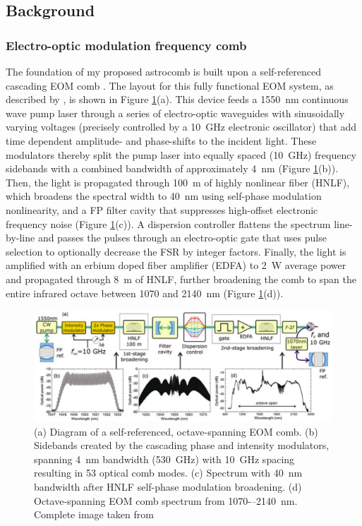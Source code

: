 \documentclass[11pt]{article}
\begin{document}
\subsection{Background}
\label{subsec:astrocomb_bkgd}

\subsubsection{Electro-optic modulation frequency comb}

The foundation of my proposed astrocomb is built upon a self-referenced cascading EOM comb \citep{Cole2015, Beha2017, Carlson2017a}. The layout for this fully functional EOM system, as described by \citet{Cole2015}, is shown in Figure \ref{fig:cole_eom}(a). This device feeds a \SI{1550}{\nano\meter} continuous wave pump laser through a series of electro-optic waveguides with sinusoidally varying voltages (precisely controlled by a \SI{10}{\giga\hertz} electronic oscillator) that add time dependent amplitude- and phase-shifts to the incident light. These modulators thereby split the pump laser into equally spaced (\SI{10}{\giga\hertz}) frequency sidebands with a combined bandwidth of approximately \SI{4}{\nano\meter} (Figure \ref{fig:cole_eom}(b)). Then, the light is propagated through \SI{100}{\meter} of highly nonlinear fiber (HNLF), which broadens the spectral width to \SI{40}{\nano\meter} using self-phase modulation nonlinearity, and a FP filter cavity that suppresses high-offset electronic frequency noise (Figure \ref{fig:cole_eom}(c)). A dispersion controller flattens the spectrum line-by-line and passes the pulses through an electro-optic gate that uses pulse selection to optionally decrease the FSR by integer factors. Finally, the light is amplified with an erbium doped fiber amplifier (EDFA) to \SI{2}{\watt} average power and propagated through \SI{8}{\meter} of HNLF, further broadening the comb to span the entire infrared octave between 1070 and \SI{2140}{\nano\meter} (Figure \ref{fig:cole_eom}(d)).

\begin{figure}
    \centering
    \includegraphics[width=\textwidth]{images/cole_eom.png}
    \caption{(a) Diagram of a self-referenced, octave-spanning EOM comb. (b) Sidebands created by the cascading phase and intensity modulators, spanning \SI{4}{\nano\meter} bandwidth (\SI{530}{\giga\hertz}) with \SI{10}{\giga\hertz} spacing resulting in 53 optical comb modes. (c) Spectrum with \SI{40}{\nano\meter} bandwidth after HNLF self-phase modulation broadening. (d) Octave-spanning EOM comb spectrum from 1070-–\SI{2140}{\nano\meter}. Complete image taken from \citet{Cole2015}}
    \label{fig:cole_eom}
\end{figure}
\end{document}
